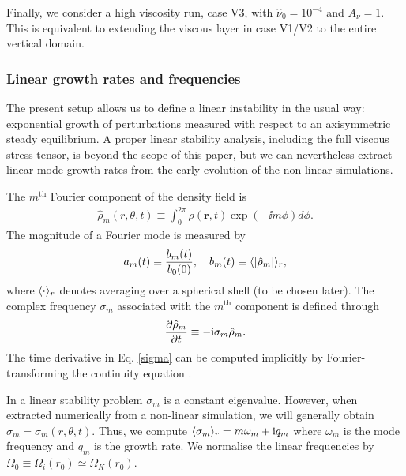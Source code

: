 Finally, we consider a high viscosity run, case V3, 
with $\hat{\nu}_0=10^{-4}$ and $A_\nu=1$.  This is equivalent to
extending the viscous layer in case V1/V2 to the entire vertical
domain.  

\subsubsection{Linear growth rates and frequencies}
The present setup allows us to define a linear instability in the
usual way: exponential growth of perturbations measured with respect
to an axisymmetric steady equilibrium. A proper linear
stability analysis, including the full viscous stress tensor, is
beyond the scope of this paper, but we can nevertheless extract linear 
mode growth rates from the early evolution of the non-linear simulations.  

The $m^\mathrm{th}$ Fourier component of the density field is  
\begin{align}
\hat{\rho}_m(r,\theta,t) \equiv \int_0^{2\pi} \rho(\bm{r},t)\exp{(-\ii m\phi)}d\phi.
\end{align}
The magnitude of a Fourier mode is measured by 
\begin{align} 
a_m(t)\equiv \frac{b_m(t)}{b_0(0)},\quad b_m(t)\equiv \langle |\hat{\rho}_m| \rangle_r,
\end{align} 
where $\langle \cdot \rangle_r$ denotes averaging over a spherical shell (to be
chosen later). 
The complex frequency $\sigma_m$ associated with the $m^\mathrm{th}$ component 
is defined through 
\begin{align}\label{sigma}
  \frac{\partial\hat{\rho}_m}{\partial t} \equiv -\mathrm{i}\sigma_m\hat{\rho}_m. 
\end{align}
The time derivative in Eq. \ref{sigma} can be computed implicitly by 
Fourier-transforming the continuity equation \citep[as done
  in][]{lin13}. 

In a linear stability problem $\sigma_m$ is a constant eigenvalue. 
However, when extracted numerically from a non-linear simulation, 
we will generally obtain $\sigma_m=\sigma_m(r,\theta,t)$. Thus, we compute 
$\langle \sigma_m \rangle_r = m\omega_m + \mathrm{i} q_m$    
where $\omega_m$ is the mode frequency and $q_m$ is the growth rate.
We normalise the linear frequencies by
$\Omega_0\equiv\Omega_i(r_0)\simeq\Omega_K(r_0)$. 

